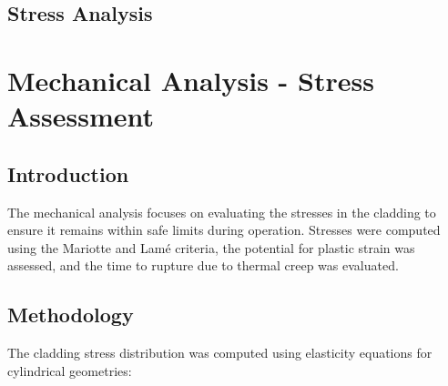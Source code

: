 \subsection{Stress Analysis}
\section{Mechanical Analysis - Stress Assessment}

\subsection{Introduction}
The mechanical analysis focuses on evaluating the stresses in the cladding to ensure it remains within safe limits during operation. Stresses were computed using the Mariotte and Lamé criteria, the potential for plastic strain was assessed, and the time to rupture due to thermal creep was evaluated.

\subsection{Methodology}
The cladding stress distribution was computed using elasticity equations for cylindrical geometries:

